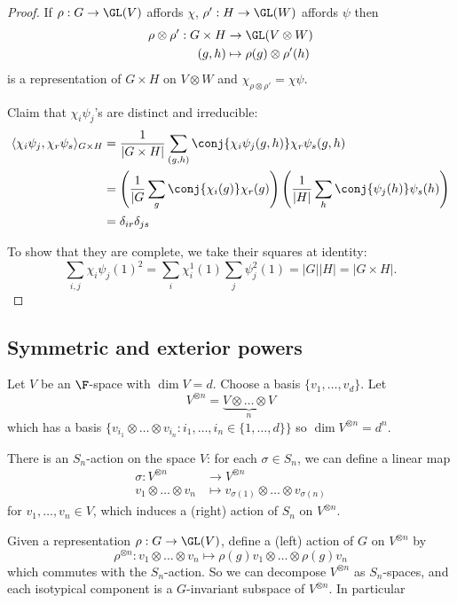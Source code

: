 \documentclass[a4paper]{article}
\theoremstyle{definition}
\begin{document}
\begin{proof}
  If \(\rho: G \to \GL(V)\) affords \(\chi\), \(\rho': H \to \GL(W)\) affords \(\psi\) then
  \begin{align*}
    \rho \otimes \rho': G \times H &\to \GL(V \otimes W) \\
    (g, h) &\mapsto \rho(g) \otimes \rho'(h)
  \end{align*}
  is a representation of \(G \times H\) on \(V \otimes W\) and \(\chi_{\rho \otimes \rho'} = \chi\psi\).

  Claim that \(\chi_i \psi_j\)'s are distinct and irreducible:
  \begin{align*}
    \langle \chi_i \psi_j, \chi_r \psi_s \rangle_{G \times H}
    &= \frac{1}{|G \times H|} \sum_{(g, h)} \conj{\chi_i\psi_j (g, h)} \chi_r \psi_s(g, h) \\
    &= \left( \frac{1}{|G} \sum_g \conj{\chi_i(g)} \chi_r(g) \right) \left( \frac{1}{|H|} \sum_h \conj{\psi_j(h)} \psi_s(h) \right) \\
    &= \delta_{ir} \delta_{js}
  \end{align*}

  To show that they are complete, we take their squares at identity:
  \[
    \sum_{i, j} \chi_i \psi_j (1)^2
    = \sum_i \chi_i^1(1) \sum_j \psi_j^2(1)
    = |G| |H|
    = |G \times H|.
  \]
\end{proof}

\subsection{Symmetric and exterior powers}

Let \(V\) be an \(\F\)-space with \(\dim V = d\). Choose a basis \(\{v_1, \dots, v_d\}\). Let
\[
  V^{\otimes n} = \underbrace{V \otimes \dots \otimes V}_n
\]
which has a basis \(\{v_{i_1} \otimes \dots \otimes v_{i_n}: i_1, \dots, i_n \in \{1, \dots, d\}\}\) so \(\dim V^{\otimes n} = d^n\).

There is an \(S_n\)-action on the space \(V\): for each \(\sigma \in S_n\), we can define a linear map
\begin{align*}
  \sigma: V^{\otimes n} &\to V^{\otimes n} \\
  v_1 \otimes \dots \otimes v_n &\mapsto v_{\sigma(1)} \otimes \dots \otimes v_{\sigma(n)}
\end{align*}
for \(v_1, \dots, v_n \in V\), which induces a (right) action of \(S_n\) on \(V^{\otimes n}\).

Given a representation \(\rho: G \to \GL(V)\), define a (left) action of \(G\) on \(V^{\otimes n}\) by
\[
  \rho^{\otimes n}: v_1 \otimes \dots \otimes v_n \mapsto \rho(g) v_1 \otimes \dots \otimes \rho(g) v_n
\]
which commutes with the \(S_n\)-action. So we can decompose \(V^{\otimes n}\) as \(S_n\)-spaces, and each isotypical component is a \(G\)-invariant subspace of \(V^{\otimes n}\). In particular
\end{document}
